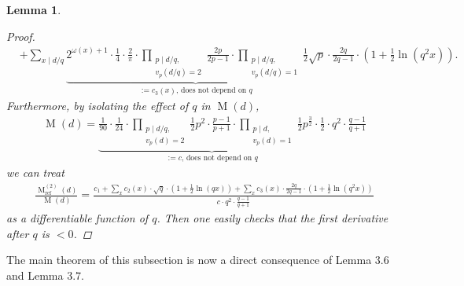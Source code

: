 \documentclass{amsart}
\newtheorem{lem}[thm]{Lemma}
\theoremstyle{definition}
\theoremstyle{remark}
\DeclareMathOperator{\M}{M}
\begin{document}
\begin{lem}
\begin{proof}
\begin{align*}
   & +   \sum_{x \mid d/q} \underbrace{2^{\omega(x)+1} \cdot \frac{1}{4} \cdot \frac{2}{\pi} 
          \cdot \prod_{\substack{p \mid d/q,\\v_p(d/q)=2}}\frac{2p}{2p-1} \cdot \prod_{\substack{p \mid d/q,\\v_p(d/q)=1}}\frac{1}{2}\sqrt{p}}_{\text{$:=c_3(x)$, does not depend on $q$}}
          \cdot \frac{2q}{2q-1} \cdot \left(1+\frac{1}{2}\ln(q^2x)\right).
  \end{align*}
  Furthermore, by isolating the effect of $q$ in $\M(d)$,
  \begin{align*}
      \M(d) = \underbrace{\frac{1}{90}\cdot \frac{1}{24} \cdot \prod_{\substack{p \mid d/q,\\v_p(d) = 2}} \frac{1}{2}p^2\cdot\frac{p-1}{p+1} 
                   \cdot \prod_{\substack{p \mid d,\\v_p(d)=1}}\frac{1}{2}p^{\tfrac{3}{2}} \cdot \frac{1}{2}}_{\text{$:=c$, does not depend on $q$}} 
                   \cdot q^2\cdot\frac{q-1}{q+1}
  \end{align*}
  we can treat 
  \begin{align*}
   \frac{\M^{(2)}_{\mathrm{ref}}(d)}{\M(d)} = \frac{c_1 + \sum_{x} c_2(x)\cdot \sqrt{q} \cdot \left(1+\tfrac{1}{2}\ln(qx)\right) + 
                                              \sum_{x} c_3(x) \cdot \tfrac{2q}{2q-1} \cdot \left(1+\tfrac{1}{2}\ln(q^2x)\right)}{c \cdot q^2\cdot\frac{q-1}{q+1}}
  \end{align*}
  as a differentiable function of $q$. Then one easily checks that the first derivative after $q$ is $<0$.
 \end{proof}
\end{lem}
The main theorem of this subsection is now a direct consequence of Lemma $3.6$ and Lemma $3.7$. 
\end{document}
